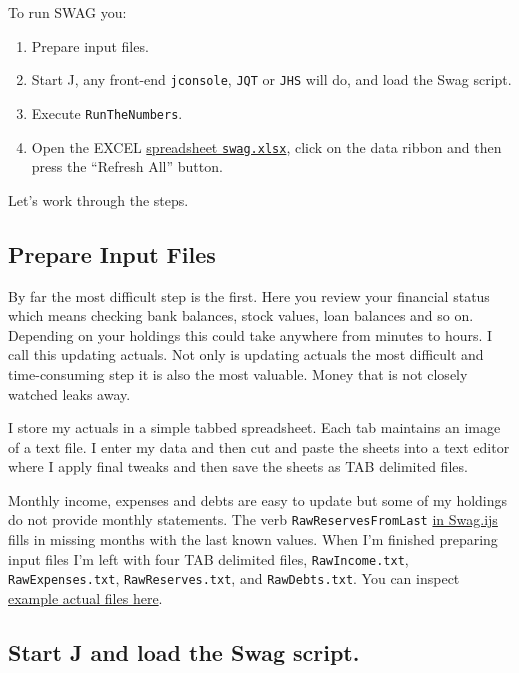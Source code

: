 To run SWAG you:

\begin{enumerate}
\def\labelenumi{\arabic{enumi}.}
\item
  Prepare input files.
\item
  Start J, any front-end \texttt{jconsole}, \texttt{JQT} or \texttt{JHS}
  will do, and load the Swag script.
\item
  Execute \texttt{RunTheNumbers}.
\item
  Open the EXCEL \href{https://github.com/bakerjd99/jacks/blob/master/swag/swag.xlsx}{spreadsheet \texttt{swag.xlsx}}, click on the data
  ribbon and then press the ``Refresh All'' button.
\end{enumerate}

Let's work through the steps.

\subsection*{Prepare Input Files}%

By far the most difficult step is the first. Here you review your
financial status which means checking bank balances, stock values, loan
balances and so on. Depending on your holdings this could take anywhere
from minutes to hours. I call this updating actuals. Not only is
updating actuals the most difficult and time-consuming step it is also
the most valuable. Money that is not closely watched leaks away.

I store my actuals in a simple tabbed spreadsheet. Each tab maintains an
image of a text file. I enter my data and then cut and paste the sheets
into a text editor where I apply final tweaks and then save the sheets
as TAB delimited files.

Monthly income, expenses and debts are easy to update but some of my
holdings do not provide monthly statements. The verb \texttt{RawReservesFromLast}
\href{https://github.com/bakerjd99/jacks/blob/master/swag/scripts/Swag.ijs}{in
Swag.ijs} fills in missing months with the last known values. When I'm
finished preparing input files I'm left with four TAB delimited
files, \texttt{RawIncome.txt}, \texttt{RawExpenses.txt},
\texttt{RawReserves.txt}, and \texttt{RawDebts.txt}. You can inspect
\href{https://github.com/bakerjd99/jacks/tree/master/swag/rawact}{example actual files here}.

\subsection*{Start J and load the Swag script.}%

